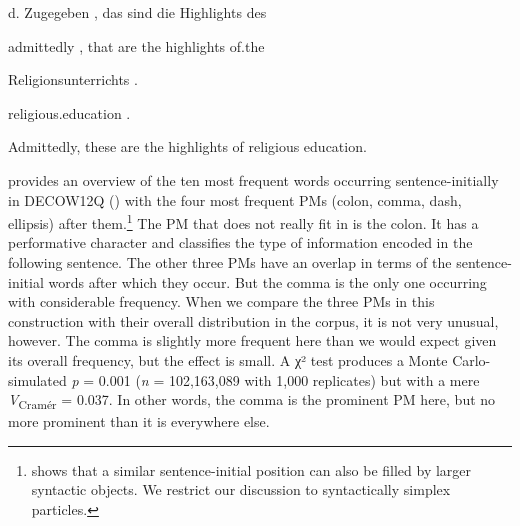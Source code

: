 \begin{styleMoutonExampleAlpha}
d.  Zugegeben  ,  das  sind  die  Highlights  des
\end{styleMoutonExampleAlpha}

\begin{styleMoutonExampleAlphaGloss}
admittedly  ,  that  are  the  highlights  of.the
\end{styleMoutonExampleAlphaGloss}

\begin{styleMoutonExampleAlphaGloss}
Religionsunterrichts  .
\end{styleMoutonExampleAlphaGloss}

\begin{styleMoutonExampleAlphaGloss}
religious.education  .
\end{styleMoutonExampleAlphaGloss}

\begin{styleMoutonExamplesTransAlpha}
Admittedly, these are the highlights of religious education.
\end{styleMoutonExamplesTransAlpha}

\begin{styleMoutonTextAfterTableFigure}
 provides an overview of the ten most frequent words occurring sentence-initially in DECOW12Q () with the four most frequent PMs (colon, comma, dash, ellipsis) after them.\footnote{\citet{Imo2012} shows that a similar sentence-initial position can also be filled by larger syntactic objects. We restrict our discussion to syntactically simplex particles.} The PM that does not really fit in is the colon. It has a performative character and classifies the type of information encoded in the following sentence. The other three PMs have an overlap in terms of the sentence-initial words after which they occur. But the comma is the only one occurring with considerable frequency. When we compare the three PMs in this construction with their overall distribution in the corpus, it is not very unusual, however. The comma is slightly more frequent here than we would expect given its overall frequency, but the effect is small. A χ² test produces a Monte Carlo-simulated \textit{p} = 0.001 (\textit{n} = 102,163,089 with 1,000 replicates) but with a mere \textit{V}\textsubscript{Cramér} = 0.037. In other words, the comma is the prominent PM here, but no more prominent than it is everywhere else.
\end{styleMoutonTextAfterTableFigure}

